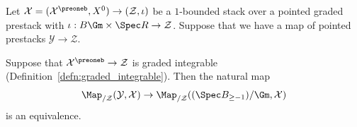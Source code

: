 \documentclass[10pt]{amsart}
\begin{document}
\subsubsection{}
Let $\mathcal{X} = (\mathcal{X}^\preoneb,X^0)\to (\mathcal{Z},\iota)$ be a $1$-bounded stack over a pointed graded prestack with $\iota:B\Gm\times\Spec R\to \mathcal{Z}$. Suppose that we have a map of pointed prestacks $\mathcal{Y}\to \mathcal{Z}$. 

\begin{proposition}
\label{prop:1bounded_graded_deformation}
Suppose that $\mathcal{X}^\preoneb\to \mathcal{Z}$ is graded integrable (Definition~\ref{defn:graded_integrable}). Then the natural map
\[
\Map_{/\mathcal{Z}}(\mathcal{Y},\mathcal{X})\to \Map_{/\mathcal{Z}}((\Spec B_{\ge-1})/\Gm,\mathcal{X})
\]
is an equivalence.
\end{proposition}
\end{document}

